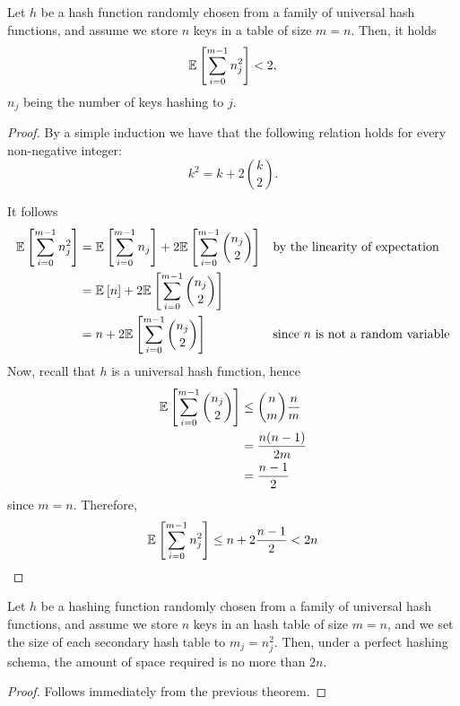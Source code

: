 \documentclass{subfiles}
\begin{document}
    \begin{theorem*}
        Let \(h\) be a hash function randomly chosen from a family of universal hash functions,
            and assume we store \(n\) keys in a table of size \(m = n\).
            Then, it holds
            \[
                \E[\sum_{i = 0}^{m - 1} n_{j}^{2}]{} < 2,
            \]
            \(n_{j}\) being the number of keys hashing to \(j\).
    \end{theorem*}
    \begin{proof}
        By a simple induction we have that the following relation holds for every non-negative integer:
        \[
            k^{2} = k + 2\binom{k}{2}.
        \]

        It follows 
        \[\begin{aligned}
            \E[\sum_{i = 0}^{m - 1} n_{j}^{2}]{} & =
                \E[\sum_{i = 0}^{m - 1} n_{j}]{} +
                2\E[\sum_{i = 0}^{m - 1} \binom{n_{j}}{2}]{} && \text{by the linearity of expectation} \\ 
                & = \E[n]{} + 2\E[\sum_{i = 0}^{m - 1} \binom{n_{j}}{2}]{} \\ 
                & = n + 2\E[\sum_{i = 0}^{m - 1} \binom{n_{j}}{2}]{} && \text{since \(n\) is not a random variable}
        \end{aligned}\]
        Now, recall that \(h\) is a universal hash function, hence 
        \[\begin{aligned}
            \E[\sum_{i = 0}^{m - 1} \binom{n_{j}}{2}]{} & \le \binom{n}{m}\frac{n}{m}  \\ 
                & = \frac{n(n - 1)}{2m} \\
                & = \frac{n - 1}{2}
        \end{aligned}\]
        since \(m = n\). Therefore, 
        \[
            \E[\sum_{i = 0}^{m - 1} n_{j}^{2}]{} \le n + 2 \frac{n - 1}{2} < 2n
        \]
    \end{proof}
    \begin{corollary*}
        Let \(h\) be a hashing function randomly chosen from a family of universal hash functions,
            and assume we store \(n\) keys in an hash table of size \(m = n\),
            and we set the size of each secondary hash table to \(m_{j} = n^{2}_{j}\).
            Then, under a perfect hashing schema, the amount of space required is no more than \(2n\).
    \end{corollary*}
    \begin{proof}
        Follows immediately from the previous theorem.
    \end{proof}

    \nocite{CormenLRS2009}
\end{document}
